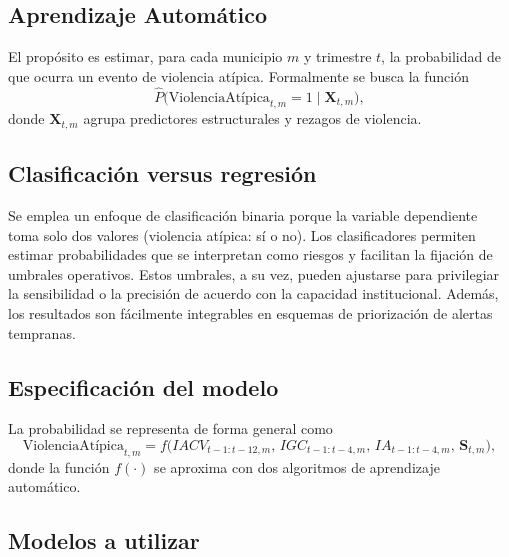 \subsection*{Aprendizaje Automático}
El propósito es estimar, para cada municipio \(m\) y trimestre \(t\), la probabilidad de que ocurra un evento de {violencia atípica}. Formalmente se busca la función
\[
\widehat{P}\bigl(\text{ViolenciaAtípica}_{t,m}=1 \mid \mathbf{X}_{t,m}\bigr),
\]
donde \(\mathbf{X}_{t,m}\) agrupa predictores estructurales y rezagos de violencia.

\subsection*{Clasificación versus regresión}

Se emplea un enfoque de clasificación binaria porque la variable dependiente toma solo dos valores (violencia atípica: sí o no). Los clasificadores permiten estimar probabilidades que se interpretan como riesgos y facilitan la fijación de umbrales operativos. Estos umbrales, a su vez, pueden ajustarse para privilegiar la sensibilidad o la precisión de acuerdo con la capacidad institucional. Además, los resultados son fácilmente integrables en esquemas de priorización de alertas tempranas.

\subsection*{Especificación del modelo}

La probabilidad se representa de forma general como
\[
\text{ViolenciaAtípica}_{t,m}
= f\!\bigl(IACV_{t-1:t-12,m},\, IGC_{t-1:t-4,m},\, IA_{t-1:t-4,m},\, \mathbf{S}_{t,m}\bigr),
\]
donde la función \(f(\cdot)\) se aproxima con dos algoritmos de aprendizaje automático. 
\subsection*{Modelos a utilizar}

